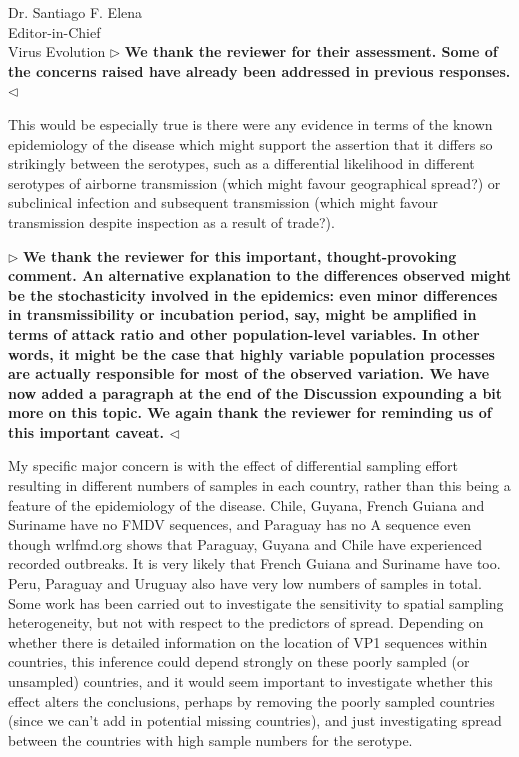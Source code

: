 \documentclass[ucla,biomath,12pt,noaddrfooter,datefrom]{UC_letter}
\newenvironment{reply}{$\triangleright$\bf}{$\triangleleft$}
\begin{document}
\begin{letter}{
Dr. Santiago F. Elena \\
Editor-in-Chief \\
Virus Evolution
}
\begin{reply}
We thank the reviewer for their assessment.
Some of the concerns raised have already been addressed in previous responses.
\end{reply}

This would be especially true is there were any evidence in terms of the known epidemiology of the disease which might support the assertion that it differs so strikingly between the serotypes, such as a differential likelihood in different serotypes of airborne transmission (which might favour geographical spread?) or subclinical infection and subsequent transmission (which might favour transmission despite inspection as a result of trade?).

\begin{reply}
We thank the reviewer for this important, thought-provoking comment.
An alternative explanation to the differences observed might be the stochasticity involved in the epidemics: even minor differences in transmissibility or incubation period, say, might be amplified in terms of attack ratio and other population-level variables.
In other words, it might be the case that highly variable population processes are actually responsible for most of the observed variation.
We have now added a paragraph at the end of the Discussion expounding a bit more on this topic.
We again thank the reviewer for reminding us of this important caveat.
\end{reply}

My specific major concern is with the effect of differential sampling effort resulting in different numbers of samples in each country, rather than this being a feature of the epidemiology of the disease. 
Chile, Guyana, French Guiana and Suriname have no FMDV sequences, and Paraguay has no A sequence even though wrlfmd.org shows that Paraguay, Guyana and Chile have experienced recorded outbreaks. 
It is very likely that French Guiana and Suriname have too. 
Peru, Paraguay and Uruguay also have very low numbers of samples in total. Some work has been carried out to investigate the sensitivity to spatial sampling heterogeneity, but not with respect to the predictors of spread. 
Depending on whether there is detailed information on the location of VP1 sequences within countries, this inference could depend strongly on these poorly sampled (or unsampled) countries, and it would seem important to investigate whether this effect alters the conclusions, perhaps by removing the poorly sampled countries (since we can't add in potential missing countries), and just investigating spread between the countries with high sample numbers for the serotype.


\end{letter}
\end{document}
